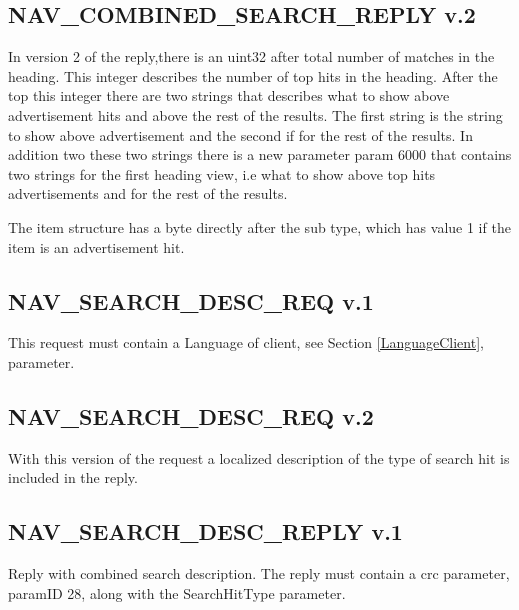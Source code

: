 \documentclass[a4paper]{article}
\begin{document}
\subsection{NAV\_COMBINED\_SEARCH\_REPLY v.2}
In version 2 of the reply,there is an uint32 after total number of matches in
the heading. This integer describes the number of top hits in the heading. 
After the top this integer there are two strings that describes what to show
above advertisement hits and above the rest of the results. The first string is
the string to show above advertisement and the second if for the rest of the
results.
In addition two these two strings there is a new parameter param 6000 that contains two strings for
the first heading view, i.e what to show above top hits advertisements and for
the rest of the results.

The item structure has a byte directly after the sub type, which has value
1 if the item is an advertisement hit.


\subsection{NAV\_SEARCH\_DESC\_REQ v.1}

This request must contain a Language of client, see Section 
\ref{LanguageClient}, parameter.

\subsection{NAV\_SEARCH\_DESC\_REQ v.2}

With this version of the request a localized description of the type of search hit is included in the reply.

\subsection{NAV\_SEARCH\_DESC\_REPLY v.1}

Reply with combined search description. The reply must contain a crc 
parameter, paramID 28, along with the SearchHitType parameter.
\end{document}
